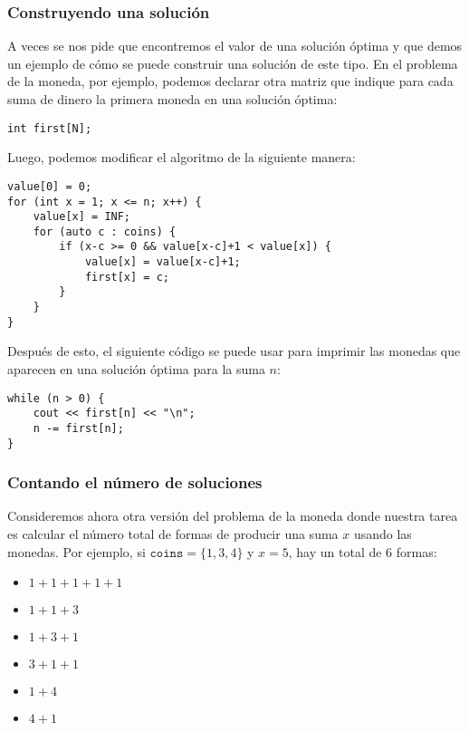 \subsubsection{Construyendo una solución}

A veces se nos pide que encontremos el valor
de una solución óptima y que demos
un ejemplo de cómo se puede construir una solución de este tipo.
En el problema de la moneda, por ejemplo,
podemos declarar otra matriz
que indique para
cada suma de dinero la primera moneda
en una solución óptima:
\begin{lstlisting}
int first[N];
\end{lstlisting}
Luego, podemos modificar el algoritmo de la siguiente manera:
\begin{lstlisting}
value[0] = 0;
for (int x = 1; x <= n; x++) {
    value[x] = INF;
    for (auto c : coins) {
        if (x-c >= 0 && value[x-c]+1 < value[x]) {
            value[x] = value[x-c]+1;
            first[x] = c;
        }
    }
}
\end{lstlisting}
Después de esto, el siguiente código se puede usar para
imprimir las monedas que aparecen en una solución óptima para
la suma $n$:
\begin{lstlisting}
while (n > 0) {
    cout << first[n] << "\n";
    n -= first[n];
}
\end{lstlisting}

\subsubsection{Contando el número de soluciones}

Consideremos ahora otra versión
del problema de la moneda donde nuestra tarea es
calcular el número total de formas
de producir una suma $x$ usando las monedas.
Por ejemplo, si $\texttt{coins}=\{1,3,4\}$ y
$x=5$, hay un total de 6 formas:

\begin{multicols}{2}
\begin{itemize}
\item $1+1+1+1+1$
\item $1+1+3$
\item $1+3+1$
\item $3+1+1$
\item $1+4$
\item $4+1$
\end{itemize}
\end{multicols}

